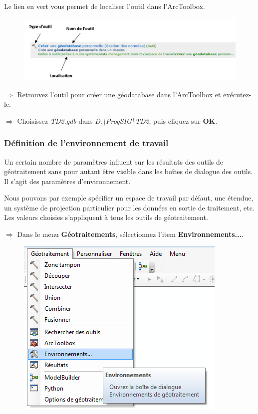 \documentclass[11pt]{article}
\newcommand{\action}{$\Rightarrow$ }
\begin{document}
Le lien en vert vous permet de localiser l'outil dans l'ArcToolbox.

\begin{figure}[H]
	\center \includegraphics{img/td3/arctoolbox_recherche-2.png}\\
\end{figure}

\action Retrouvez l'outil pour créer une géodatabase dans l'ArcToolbox et exécutez-le.

\action Choisissez \textit{TD2.gdb} dans \textit{D:\textbackslash{}ProgSIG\textbackslash{}TD2}, puis cliquez sur \textbf{OK}.


\subsubsection{Définition de l'environnement de travail}
Un certain nombre de paramètres influent sur les résultats des outils de géotraitement sans pour autant être visible dans les boîtes de dialogue des outils. Il s'agit des paramètres d'environnement.

Nous pouvons par exemple spécifier un espace de travail par défaut, une étendue, un système de projection particulier pour les données en sortie de traitement, etc. Les valeurs choisies s'appliquent à tous les outils de géotraitement.

\action Dans le menu \textbf{Géotraitements}, sélectionnez l'item \textbf{Environnements...}.
\begin{figure}[H]
	\center \includegraphics{img/td3/environnements_menu.png}\\
\end{figure}
\end{document}

